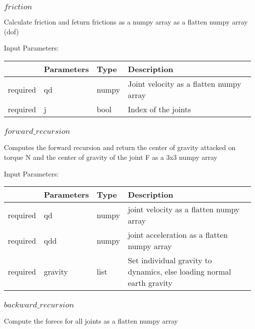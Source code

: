 \documentclass[
	ngerman,
	accentcolor=9c,%
	type=intern,
	marginpar=false
	]{tudapub}
\begin{document}
\vspace{1cm}

\subsubsection{$friction$}
\noindent Calculate friction and feturn frictions as a numpy array as a flatten numpy array (dof)

\vspace{0.5cm}
\noindent Input Parameters:
\vspace{0.5cm}

\begin{tabular}{|p{}|p{}|p{}| p{}|}
\hline
 & \textbf{Parameters} & \textbf{Type} & \textbf{Description} \\
\hline
required & qd & numpy &  Joint velocity as a flatten numpy array\\
\hline
required & j & bool & Index of the joints\\
\hline
\end{tabular}
\vspace{1cm}


\subsubsection{$forward\_recursion$}
\noindent Computes the forward recursion and return the center of gravity attacked on torque N and the center of gravity of the joint F as a 3x3 numpy array

\vspace{0.5cm}
\noindent Input Parameters:
\vspace{0.5cm}

\begin{tabular}{|p{}|p{}|p{}| p{}|}
\hline
 & \textbf{Parameters} & \textbf{Type} & \textbf{Description} \\
\hline
required & qd & numpy &   joint velocity as a flatten numpy array\\
\hline
required & qdd & numpy & joint acceleration as a flatten numpy array\\
\hline
required & gravity & list & Set individual gravity to dynamics, else loading normal earth gravity \\
\hline
\end{tabular}
\vspace{1cm}


\subsubsection{$backward\_recursion$}
\noindent Compute the forecs for all joints as a flatten numpy array
\end{document}
